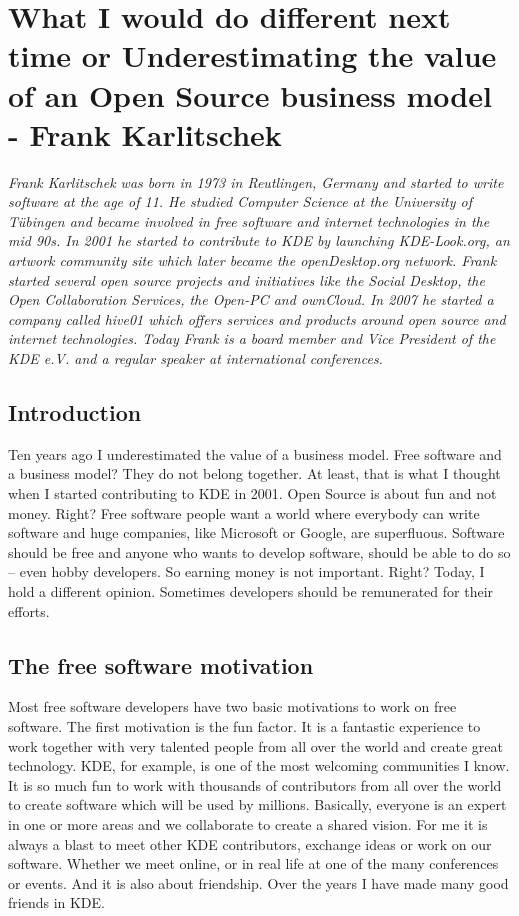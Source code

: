 \chapter{What I would do different next time or Underestimating the value of an Open Source business model - Frank Karlitschek}

\textit{Frank Karlitschek was born in 1973 in Reutlingen, Germany and started to write software at the age of 11. He studied Computer Science at the University of T\"ubingen and became involved in free software and internet technologies in the mid 90s. In 2001 he started to contribute to KDE by launching KDE-Look.org, an artwork community site which later became the openDesktop.org network. Frank started several open source projects and initiatives like the Social Desktop, the Open Collaboration Services, the Open-PC and ownCloud. In 2007 he started a company called hive01 which offers services and products around open source and internet technologies.
Today Frank is a board member and Vice President of the KDE e.V. and a regular speaker at international conferences.}

\section*{Introduction}

Ten years ago I underestimated the value of a business model. Free software and a business model? They do not belong together. At least, that is what I thought when I started contributing to KDE in 2001. Open Source is about fun and not money. Right? Free software people want a world where everybody can write software and huge companies, like Microsoft or Google, are superfluous. Software should be free and anyone who wants to develop software, should be able to do so -- even hobby developers. So earning money is not important. Right? Today, I hold a different opinion. Sometimes developers should be remunerated for their efforts.  

\section*{The free software motivation}

Most free software developers have two basic motivations to work on free software. The first motivation is the fun factor. It is a fantastic experience to work together with very talented people from all over the world and create great technology. KDE, for example, is one of the most welcoming communities I know. It is so much fun to work with thousands of contributors from all over the world to create software which will be used by millions. Basically, everyone is an expert in one or more areas and we collaborate to create a shared vision. For me it is always a blast to meet other KDE contributors, exchange ideas or work on our software. Whether we meet online, or in real life at one of the many conferences or events. And it is also about friendship. Over the years I have made many good friends in KDE.

